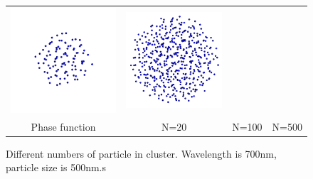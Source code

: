 \begin{figure}
\begin{tabular}{cccc}
        \includegraphics[width=\resLen]{images/particle/validate3_D2_N100_500nm.png} &
        \includegraphics[width=\resLen]{images/particle/validate10_D2_N500_500nm.png} 
        \\
        Phase function & N=20 & N=100 & N=500
    \end{tabular}
    \caption{\label{fig:cluster}
        Different numbers of particle in cluster. Wavelength is 700nm, particle size is 500nm.s
    }
\end{figure}

